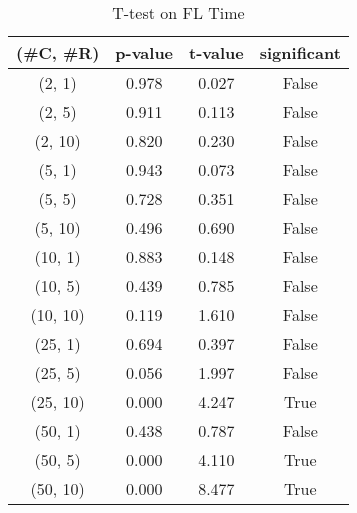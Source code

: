 \begin{table}[h]
\centering
\caption{T-test on FL Time}
\label{tab:t-testFL}
\begin{tabular}{|c|c|c|c|}
\toprule
(\#C, \#R) &  p-value &  t-value &  significant \\
\midrule
  (2, 1) &    0.978 &    0.027 &        False \\
  (2, 5) &    0.911 &    0.113 &        False \\
 (2, 10) &    0.820 &    0.230 &        False \\
  (5, 1) &    0.943 &    0.073 &        False \\
  (5, 5) &    0.728 &    0.351 &        False \\
 (5, 10) &    0.496 &    0.690 &        False \\
 (10, 1) &    0.883 &    0.148 &        False \\
 (10, 5) &    0.439 &    0.785 &        False \\
(10, 10) &    0.119 &    1.610 &        False \\
 (25, 1) &    0.694 &    0.397 &        False \\
 (25, 5) &    0.056 &    1.997 &        False \\
(25, 10) &    0.000 &    4.247 &         True \\
 (50, 1) &    0.438 &    0.787 &        False \\
 (50, 5) &    0.000 &    4.110 &         True \\
(50, 10) &    0.000 &    8.477 &         True \\
\bottomrule
\end{tabular}
\end{table}
